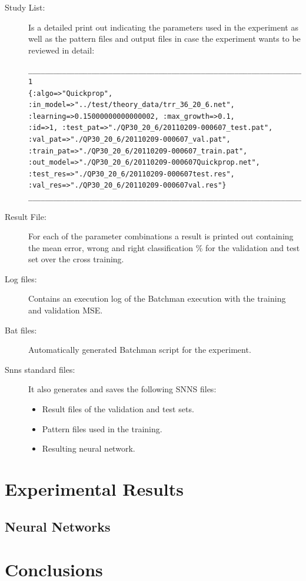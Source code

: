 \documentclass[a4paper,10pt,titlepage]{article}
\begin{document}
\begin{description}
	\item[Study List:] Is a detailed print out indicating the parameters used in the experiment as well as the pattern files and output files in case the experiment wants to be reviewed in detail:
	{\footnotesize\begin{verbatim}
______________________________________________________________________________________
1
{:algo=>"Quickprop", :in_model=>"../test/theory_data/trr_36_20_6.net", :learning=>0.15000000000000002, :max_growth=>0.1, 
:id=>1, :test_pat=>"./QP30_20_6/20110209-000607_test.pat", :val_pat=>"./QP30_20_6/20110209-000607_val.pat", 
:train_pat=>"./QP30_20_6/20110209-000607_train.pat", :out_model=>"./QP30_20_6/20110209-000607Quickprop.net", 
:test_res=>"./QP30_20_6/20110209-000607test.res", :val_res=>"./QP30_20_6/20110209-000607val.res"}
______________________________________________________________________________________
	\end{verbatim}}
	
	\item[Result File:] For each of the parameter combinations a result is printed out containing the mean error, wrong and right classification \% for the validation and test set over the cross training.
	\item[Log files:] Contains an execution log of the Batchman execution with the training and validation MSE.
	\item[Bat files:] Automatically generated Batchman script for the experiment.
	\item[Snns standard files:] It also generates and saves the following SNNS files:
	\begin{itemize}
		\item Result files of the validation and test sets.
		\item Pattern files used in the training.
		\item Resulting neural network.
	\end{itemize}
\end{description}


\section{Experimental Results}
\subsection{Neural Networks}


\section{Conclusions}
\end{document}
